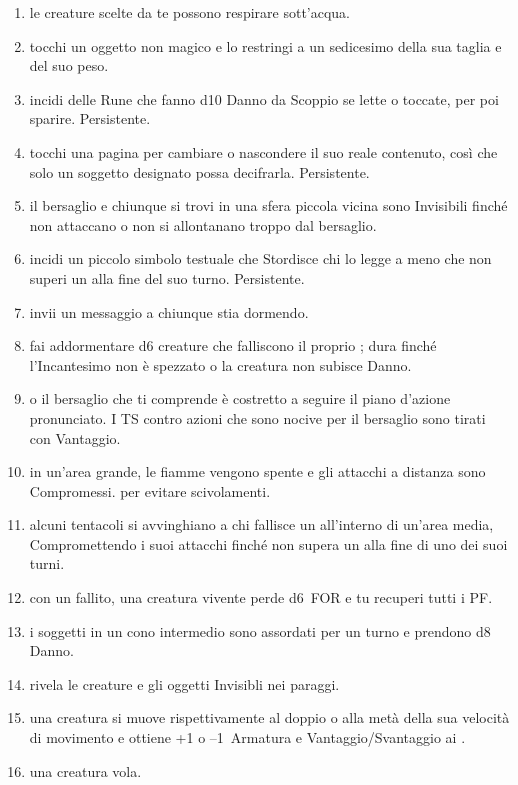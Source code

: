 \documentclass[itdr]{subfiles}
\begin{document}
\begin{enumerate}
	\item {} le creature scelte da te possono respirare sott'acqua.
	\item {} tocchi un oggetto non magico e lo restringi a un sedicesimo della sua taglia e del suo peso.
	\item {} incidi delle Rune che fanno d10 Danno da Scoppio se lette o toccate, per poi sparire. Persistente.
	\item {} tocchi una pagina per cambiare o nascondere il suo reale contenuto, così che solo un soggetto designato possa decifrarla. Persistente.
	\item {} il bersaglio e chiunque si trovi in una sfera piccola vicina sono Invisibili finché non attaccano o non si allontanano troppo dal bersaglio.
	\item {} incidi un piccolo simbolo testuale che Stordisce chi lo legge a meno che non superi un  alla fine del suo turno. Persistente.
	\item {} invii un messaggio a chiunque stia dormendo.
	\item {} fai addormentare d6 creature che falliscono il proprio ; dura finché l'Incantesimo non è spezzato o la creatura non subisce Danno.
	\item {}  o il bersaglio che ti comprende è costretto a seguire il piano d'azione pronunciato. I TS contro azioni che sono nocive per il bersaglio sono tirati con Vantaggio.
	\item {} in un'area grande, le fiamme vengono spente e gli attacchi a distanza sono Compromessi.  per evitare scivolamenti.
	\item {} alcuni tentacoli si avvinghiano a chi fallisce un  all'interno di un'area media, Compromettendo i suoi attacchi finché non supera un  alla fine di uno dei suoi turni.
	\item {} con un  fallito, una creatura vivente perde d6~FOR e tu recuperi tutti i PF.
	\item {} i soggetti in un cono intermedio sono assordati per un turno e prendono d8 Danno.
	\item {} rivela le creature e gli oggetti Invisibli nei paraggi.
	\item {} una creatura si muove rispettivamente al doppio o alla metà della sua velocità di movimento e ottiene +1 o --1~Armatura e Vantaggio/Svantaggio ai .
	\item {} una creatura vola.
\end{enumerate}
\end{document}
